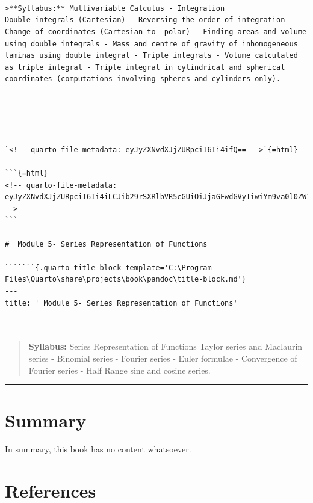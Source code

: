 \documentclass[
  letterpaper,
  DIV=11,
  numbers=noendperiod]{scrreprt}
\begin{document}
\begin{verbatim}



>**Syllabus:** Multivariable Calculus - Integration
Double integrals (Cartesian) - Reversing the order of integration - Change of coordinates (Cartesian to  polar) - Finding areas and volume using double integrals - Mass and centre of gravity of inhomogeneous laminas using double integral - Triple integrals - Volume calculated as triple integral - Triple integral in cylindrical and spherical coordinates (computations involving spheres and cylinders only).

----



`<!-- quarto-file-metadata: eyJyZXNvdXJjZURpciI6Ii4ifQ== -->`{=html}

```{=html}
<!-- quarto-file-metadata: eyJyZXNvdXJjZURpciI6Ii4iLCJib29rSXRlbVR5cGUiOiJjaGFwdGVyIiwiYm9va0l0ZW1OdW1iZXIiOjYsImJvb2tJdGVtRmlsZSI6Im1vZHVsZTUucW1kIiwiYm9va0l0ZW1EZXB0aCI6MH0= -->
```

#  Module 5- Series Representation of Functions 

```````{.quarto-title-block template='C:\Program Files\Quarto\share\projects\book\pandoc\title-block.md'}
---
title: ' Module 5- Series Representation of Functions'

---
\end{verbatim}

\begin{quote}
\textbf{Syllabus:} Series Representation of Functions Taylor series and
Maclaurin series - Binomial series - Fourier series - Euler formulae -
Convergence of Fourier series - Half Range sine and cosine series.
\end{quote}

\begin{center}\rule{0.5\linewidth}{0.5pt}\end{center}


\chapter{Summary}\label{summary}

In summary, this book has no content whatsoever.


\chapter*{References}\label{references}


\label{refs}
\end{document}
